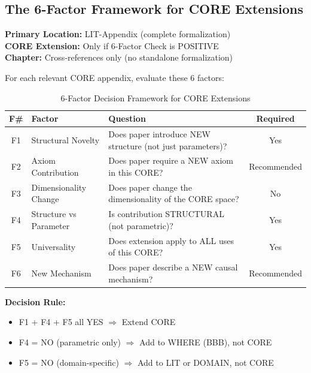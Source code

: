 \subsection{The 6-Factor Framework for CORE Extensions}
\label{sec:paperint-6factor}

\begin{tcolorbox}[colback=blue!5!white, colframe=blue!75!black,
    title=Architecture Principle: LIT $\to$ CORE $\to$ Chapter]
\textbf{Primary Location:} LIT-Appendix (complete formalization)\\
\textbf{CORE Extension:} Only if 6-Factor Check is POSITIVE\\
\textbf{Chapter:} Cross-references only (no standalone formalization)
\end{tcolorbox}

For each relevant CORE appendix, evaluate these 6 factors:

\begin{table}[htbp]
\centering
\caption{6-Factor Decision Framework for CORE Extensions}
\label{tab:6factor-framework}
\begin{tabular}{@{}clp{7cm}c@{}}
\toprule
\textbf{F\#} & \textbf{Factor} & \textbf{Question} & \textbf{Required} \\
\midrule
F1 & Structural Novelty & Does paper introduce NEW structure (not just parameters)? & Yes \\
F2 & Axiom Contribution & Does paper require a NEW axiom in this CORE? & Recommended \\
F3 & Dimensionality Change & Does paper change the dimensionality of the CORE space? & No \\
F4 & Structure vs Parameter & Is contribution STRUCTURAL (not parametric)? & Yes \\
F5 & Universality & Does extension apply to ALL uses of this CORE? & Yes \\
F6 & New Mechanism & Does paper describe a NEW causal mechanism? & Recommended \\
\bottomrule
\end{tabular}
\end{table}

\textbf{Decision Rule:}
\begin{itemize}
    \item F1 + F4 + F5 all YES $\Rightarrow$ Extend CORE
    \item F4 = NO (parametric only) $\Rightarrow$ Add to WHERE (BBB), not CORE
    \item F5 = NO (domain-specific) $\Rightarrow$ Add to LIT or DOMAIN, not CORE
\end{itemize}

